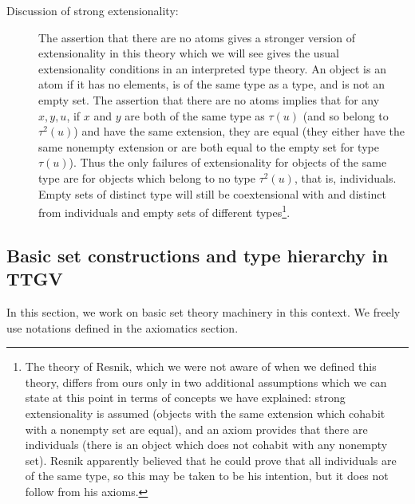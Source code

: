 \documentclass[12pt]{article}
\begin{document}
\begin{description}
\item[Discussion of strong extensionality:]  The assertion that there are no atoms gives a stronger version of extensionality in this theory which we will see gives the usual extensionality conditions in an interpreted type theory.  An object is an atom if it has no elements, is of the same type as a type, and is not an empty set.   The assertion that there are no atoms implies
that for any $x,y,u$, if $x$ and $y$ are both of the same type as $\tau(u)$ (and so belong to $\tau^2(u)$) and have the same extension, they are equal (they either have the same nonempty extension or are both equal to the empty set for type $\tau(u)$).  Thus the only failures of extensionality for objects of the same type are for objects which belong to no type $\tau^2(u)$, that is, individuals.  Empty sets of distinct type will still be coextensional with and distinct from individuals and
empty sets of different types\footnote{The theory of Resnik, which we were not aware of when we defined this theory, differs from ours only in two additional assumptions which we can state at this point in terms of concepts we have explained:  strong extensionality is assumed (objects with the same extension which cohabit with a nonempty set are equal), and an axiom provides that there are individuals (there is an object which does not cohabit with any nonempty set).  Resnik apparently believed that he could prove that all individuals are of the same type, so this may be taken to be his intention, but it does not follow from his axioms.}.

\end{description}

\newpage

\subsection{Basic set constructions and type hierarchy in TTGV}

In this section, we work on basic set theory machinery in this context.  We freely use notations defined in the axiomatics section.
\end{document}
